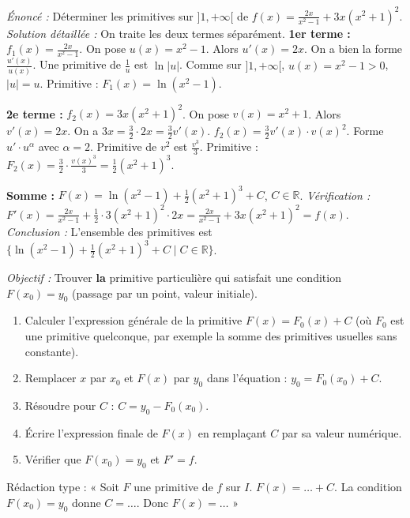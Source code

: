 \documentclass[11pt]{article}
\newcommand{\cle}[1]{{\popxbold\color{popdark}#1}}
\begin{document}
\begin{exoresolu}
\emph{Énoncé :} Déterminer les primitives sur $]1, +\infty[$ de $f(x) = \frac{2x}{x^2-1} + 3x(x^2+1)^2$.
\tcblower
\emph{Solution détaillée :}
On traite les deux termes séparément.
\textbf{1er terme :} $f_1(x) = \frac{2x}{x^2-1}$.
On pose $u(x) = x^2-1$. Alors $u'(x) = 2x$. On a bien la forme $\frac{u'(x)}{u(x)}$.
Une primitive de $\frac{1}{u}$ est $\ln|u|$. Comme sur $]1,+\infty[$, $u(x)=x^2-1 > 0$, $|u|=u$.
Primitive : $F_1(x) = \ln(x^2-1)$.

\textbf{2e terme :} $f_2(x) = 3x(x^2+1)^2$.
On pose $v(x) = x^2+1$. Alors $v'(x) = 2x$. On a $3x = \frac{3}{2} \cdot 2x = \frac{3}{2}v'(x)$.
$f_2(x) = \frac{3}{2} v'(x) \cdot v(x)^2$. Forme $u' \cdot u^\alpha$ avec $\alpha=2$.
Primitive de $v^2$ est $\frac{v^3}{3}$.
Primitive : $F_2(x) = \frac{3}{2} \cdot \frac{v(x)^3}{3} = \frac{1}{2}(x^2+1)^3$.

\textbf{Somme :} $F(x) = \ln(x^2-1) + \frac{1}{2}(x^2+1)^3 + C$, $C \in \mathbb{R}$.
\emph{Vérification :}
$F'(x) = \frac{2x}{x^2-1} + \frac{1}{2} \cdot 3(x^2+1)^2 \cdot 2x = \frac{2x}{x^2-1} + 3x(x^2+1)^2 = f(x)$.
\emph{Conclusion :} L'ensemble des primitives est $\{ \ln(x^2-1) + \frac{1}{2}(x^2+1)^3 + C \mid C \in \mathbb{R} \}$.
\end{exoresolu}

\begin{methode}
\emph{Objectif :} Trouver \textbf{la} primitive particulière qui satisfait une condition $F(x_0) = y_0$ (passage par un point, valeur initiale).
\begin{enumerate}
    \item Calculer l'expression générale de la primitive $F(x) = F_0(x) + C$ (où $F_0$ est une primitive quelconque, par exemple la somme des primitives usuelles sans constante).
    \item Remplacer $x$ par $x_0$ et $F(x)$ par $y_0$ dans l'équation : $y_0 = F_0(x_0) + C$.
    \item Résoudre pour $C$ : $C = y_0 - F_0(x_0)$.
    \item Écrire l'expression finale de $F(x)$ en remplaçant $C$ par sa valeur numérique.
    \item Vérifier que $F(x_0)=y_0$ et $F'=f$.
\end{enumerate}
\cle{Rédaction type :} « Soit $F$ une primitive de $f$ sur $I$. $F(x) = \dots + C$. La condition $F(x_0)=y_0$ donne $C = \dots$. Donc $F(x) = \dots$ »
\end{methode}
\end{document}

